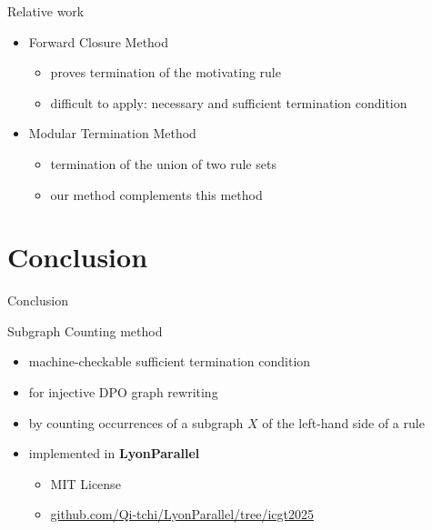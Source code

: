 \documentclass{beamer}
\begin{document}
\begin{frame}{Relative work}
\begin{itemize}
        \item Forward Closure Method~\cite{plump1995ontermination}
             \begin{itemize}
                \item proves termination of the motivating rule
                \item difficult to apply: necessary and sufficient termination condition
             \end{itemize}
        \item Modular Termination Method~\cite{plump2018modular}
             \begin{itemize}
                \item termination of the union of two rule sets
                \item our method complements this method
             \end{itemize}
    \end{itemize}
\end{frame}

\section{Conclusion}
\begin{frame}{Conclusion}

    Subgraph Counting method  
    \begin{itemize}
        \item machine-checkable sufficient termination condition
        \item for injective DPO graph rewriting
        \item by counting occurrences of a subgraph $X$ of the left-hand side of a rule
        \item implemented in \textbf{LyonParallel}
            \begin{itemize}
                \item MIT License
                \item \url{github.com/Qi-tchi/LyonParallel/tree/icgt2025}
            \end{itemize}
    \end{itemize}





\end{frame}
\end{document}
